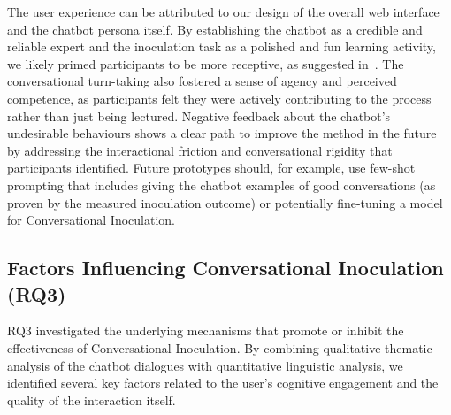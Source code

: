 \documentclass[sigconf]{acmart}
\begin{document}
The user experience can be attributed to our design of the overall web interface and the chatbot persona itself. 
By establishing the chatbot as a credible and reliable expert and the inoculation task as a polished and fun learning activity, we likely primed participants to be more receptive, as suggested in~\cite{Banas_Rains_2010}.
The conversational turn-taking also fostered a sense of agency and perceived competence, as participants felt they were actively contributing to the process rather than just being lectured.
Negative feedback about the chatbot's undesirable behaviours shows a clear path to improve the method in the future by addressing the interactional friction and conversational rigidity that participants identified. 
Future prototypes should, for example, use few-shot prompting that includes giving the chatbot examples of good conversations (as proven by the measured inoculation outcome) or potentially fine-tuning a model for Conversational Inoculation.

\subsection{Factors Influencing Conversational Inoculation (RQ3)}

RQ3 investigated the underlying mechanisms that promote or inhibit the effectiveness of Conversational Inoculation.
By combining qualitative thematic analysis of the chatbot dialogues with quantitative linguistic analysis, we identified several key factors related to the user's cognitive engagement and the quality of the interaction itself.
\end{document}
